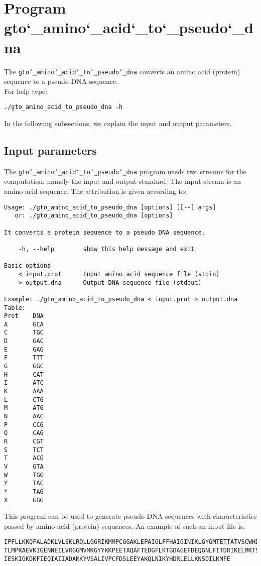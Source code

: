 \section{Program gto\char`_amino\char`_acid\char`_to\char`_pseudo\char`_dna}

The \texttt{gto\char`_amino\char`_acid\char`_to\char`_pseudo\char`_dna} converts an amino acid (protein) sequence to a pseudo-DNA sequence.\\

For help type:
\begin{lstlisting}
./gto_amino_acid_to_pseudo_dna -h
\end{lstlisting}
In the following subsections, we explain the input and output parameters.

\subsection*{Input parameters}

The \texttt{gto\char`_amino\char`_acid\char`_to\char`_pseudo\char`_dna} program needs two streams for the computation, namely the input and output standard. The input stream is an amino acid sequence.
The attribution is given according to:
\begin{lstlisting}
Usage: ./gto_amino_acid_to_pseudo_dna [options] [[--] args]
   or: ./gto_amino_acid_to_pseudo_dna [options]

It converts a protein sequence to a pseudo DNA sequence.

    -h, --help        show this help message and exit

Basic options
    < input.prot      Input amino acid sequence file (stdin)
    > output.dna      Output DNA sequence file (stdout)

Example: ./gto_amino_acid_to_pseudo_dna < input.prot > output.dna
Table:
Prot	DNA
A		GCA
C		TGC
D		GAC
E		GAG
F		TTT
G		GGC
H		CAT
I		ATC
K		AAA
L		CTG
M		ATG
N		AAC
P		CCG
Q		CAG
R		CGT
S		TCT
T		ACG
V		GTA
W		TGG
Y		TAC
*		TAG
X		GGG
\end{lstlisting}
This program can be used to generate pseudo-DNA sequences with characteristics passed by amino acid (protein) sequences. An example of such an input file is:
\begin{lstlisting}
IPFLLKKQFALADKLVLSKLRQLLGGRIKMMPCGGAKLEPAIGLFFHAIGINIKLGYGMTETTATVSCWHDFQFNPNSIG
TLMPKAEVKIGENNEILVRGGMVMKGYYKKPEETAQAFTEDGFLKTGDAGEFDEQGNLFITDRIKELMKTSNGKYIAPQY
IESKIGKDKFIEQIAIIADAKKYVSALIVPCFDSLEEYAKQLNIKYHDRLELLKNSDILKMFE
\end{lstlisting}

